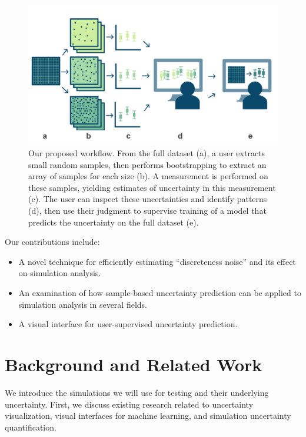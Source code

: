 \begin{figure}[h]
    \centering
    \includegraphics[width=\textwidth]{images/sampling/uncertainty_with_small_samples_labeled}
    \caption{Our proposed workflow. From the full dataset (a), a user extracts small random samples, then performs bootstrapping to extract an array of samples for each size (b). A measurement is performed on these samples, yielding estimates of uncertainty in this measurement (c). The user can inspect these uncertainties and identify patterns (d), then use their judgment to supervise training of a model that predicts the uncertainty on the full dataset (e). %
    }
     \label{workflow}
\end{figure}

Our contributions include:
\begin{itemize}
\item{A novel technique for efficiently estimating ``discreteness noise'' and its effect on simulation analysis.}
\item{An examination of how sample-based uncertainty prediction can be applied to simulation analysis in several fields.}
\item{A visual interface for user-supervised uncertainty prediction.}
\end{itemize}

\section{Background and Related Work}
We introduce the simulations we will use for testing and their underlying uncertainty. First, we discuss existing research related to uncertainty visualization, visual interfaces for machine learning, and simulation uncertainty quantification.

